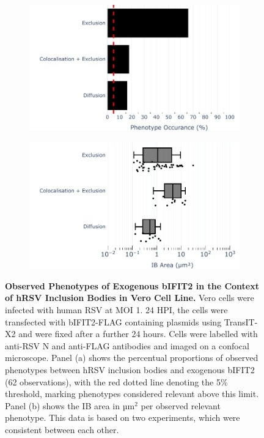 \begin{figure}
    \begin{subfigure}{0.495\textwidth}
        \caption{}
        \includegraphics[width=1\linewidth]{09. Chapter 4/Figs/02. Overexpression/02. IFIT2/04. bar_bi2f_hrsv.pdf} 
    \end{subfigure}
    \begin{subfigure}{0.495\textwidth}
        \caption{}
        \includegraphics[width=1\linewidth]{09. Chapter 4/Figs/02. Overexpression/02. IFIT2/05. box_bi2f_hrsv.pdf}
    \end{subfigure}
    \caption[Observed Phenotypes of Exogenous bIFIT2 in the Context of hRSV Inclusion Bodies in Vero Cell Line.]{\textbf{Observed Phenotypes of Exogenous bIFIT2 in the Context of hRSV Inclusion Bodies in Vero Cell Line.} Vero cells were infected with human RSV at MOI 1. 24 HPI, the cells were transfected with bIFIT2-FLAG containing plasmids using TransIT-X2 and were fixed after a further 24 hours. Cells were labelled with anti-RSV N and anti-FLAG antibodies and imaged on a confocal microscope. Panel (a) shows the percentual proportions of observed phenotypes between hRSV inclusion bodies and exogenous bIFIT2 (62 observations), with the red dotted line denoting the 5\% threshold, marking phenotypes considered relevant above this limit. Panel (b) shows the IB area in \(\mbox{µm}^2\) per observed relevant phenotype. This data is based on two experiments, which were consistent between each other.}
    \label{fig:Observed Phenotypes of Exogenous bIFIT2 in the Context of hRSV Inclusion Bodies in Vero Cell Line}
\end{figure}

